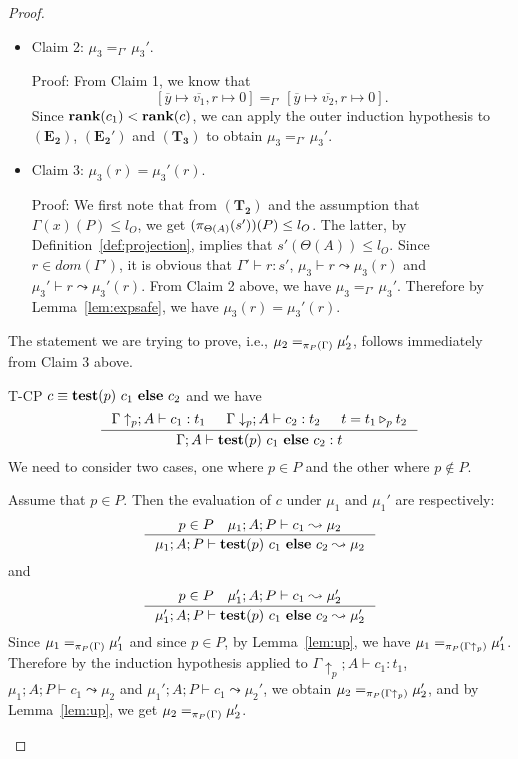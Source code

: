 {{{\begin{proof}
\begin{ProofEnumDesc}
\begin{itemize}
Proof:
Let $\rho = [\overline{y} \mapsto \overline{v_1}, r \mapsto 0]$
and $\rho' = [\overline{y} \mapsto \overline{v_2}, r \mapsto 0]$.
We only need to check that the two mappings
agree on mappings of $\overline{y}$ that are of type $\leq \hat{l}_O.$
Suppose $y_u$ is such a variable, i.e., $\Gamma'(y_u) = u \leq \hat{l}_O$,
and suppose $\rho(y_u) = v_u$ and
$\rho'(y_u) = v_u'$ for some $y_u \in \overline{y}.$
From $(\mathbf{E_1})$ we have
$\mu_1 \vdash e_u \leadsto v_u$
and from $(\mathbf{E_2})$
we have $\mu_1' \vdash e_u \leadsto v_u'$,
and from $(\mathbf{T_1})$ we have $\Gamma \vdash e_u : u.$
Since $u \leq \hat{l}_O$, applying Lemma~\ref{lem:expsafe},
we get $v_u = v_u'$.


\item Claim 2: $\mu_3 =_{\Gamma'} \mu_3'.$

Proof: From Claim 1, we know that
$$[\overline{y} \mapsto \overline{v_1}, r \mapsto 0]
=_{\Gamma'} [\overline{y} \mapsto \overline{v_2}, r \mapsto 0].$$
Since $\rank{c_1}<\rank{c}$, we can apply the outer induction
hypothesis to $(\mathbf{E_2})$, $(\mathbf{E_2'})$
and $(\mathbf{T_3})$ to obtain
$\mu_3 =_{\Gamma'} \mu_3'.$

\item Claim 3: $\mu_3(r) = \mu_3'(r).$

Proof: We first note that from $(\mathbf{T_2})$
and the assumption that $\Gamma(x)(P) \leq l_O$, we get
$(\app{s'}{\Theta(A)})(P) \leq l_O$.
The latter, by Definition~\ref{def:projection}, implies  that $s'(\Theta(A)) \leq l_O.$
Since $r \in dom(\Gamma')$, it is obvious that
$\Gamma' \vdash r : s'$,
$\mu_3 \vdash r \leadsto \mu_3(r)$
and $\mu_3' \vdash r \leadsto \mu_3'(r).$
From Claim 2 above, we have $\mu_3 =_{\Gamma'} \mu_3'$.
Therefore by Lemma~\ref{lem:expsafe}, we have
$\mu_3(r) = \mu_3'(r).$
\end{itemize}
The statement we are trying to prove, i.e., $\mu_2 =_{\app{\Gamma}{P}} \mu_2'$,
follows immediately from Claim 3 above.
\item[T-CP] $c\equiv\lcCP{p}{c_1}{c_2}$ and we have
$$
\inference
{\Gamma\uparrow_{p} ; A \vdash c_1 : t_1 &
\Gamma\downarrow_{p} ; A\vdash c_2 : t_2 &
t=\omerge {p} {t_1} {t_2}}
{\Gamma; A\vdash \lcCP{p}{c_1}{c_2} : t}
$$
We need to consider two cases, one where $p \in P$
and the other where $p \not \in P$.

Assume that $p \in P.$
Then the evaluation of $c$ under $\mu_1$ and $\mu_1'$
are respectively:
$$
\inference{p\in P \quad \mu_1; A; P \vdash c_1 \leadsto \mu_2}
{\mu_1; A ; P \vdash \lcCP{p}{c_1}{c_2} \leadsto \mu_2}
$$
and
$$
\inference
    {p\in P \quad \mu_1'; A; P \vdash c_1 \leadsto \mu_2'}
    {\mu_1'; A ; P \vdash \lcCP{p}{c_1}{c_2} \leadsto \mu_2'}
$$
Since $\mu_1 =_{\app{\Gamma}{P}} \mu_1'$ and since $p \in P$,
by Lemma~\ref{lem:up}, we have $\mu_1 =_{\app{\Gamma\uparrow_p}{P}} \mu_1'$.
Therefore by the induction hypothesis applied to $\Gamma\uparrow_p ; A \vdash c_1 : t_1$,
$\mu_1; A; P \vdash c_1 \leadsto \mu_2$ and
$\mu_1'; A; P \vdash c_1 \leadsto \mu_2'$, we obtain
$\mu_2 =_{\app{\Gamma\uparrow_p}{P}} \mu_2'$, and by Lemma~\ref{lem:up},
we get $\mu_2 =_{\app{\Gamma}{P}} \mu_2'$.


\end{ProofEnumDesc}
\end{proof}}}}
